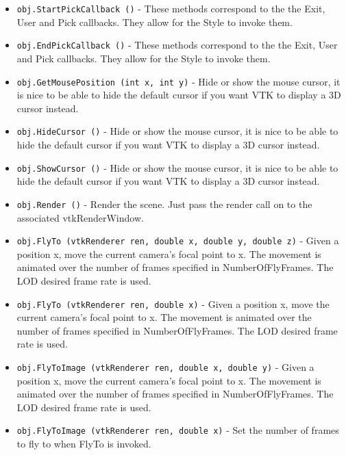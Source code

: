 \begin{itemize}
\item  \verb|obj.StartPickCallback ()| -  These methods correspond to the the Exit, User and Pick
 callbacks. They allow for the Style to invoke them.

\item  \verb|obj.EndPickCallback ()| -  These methods correspond to the the Exit, User and Pick
 callbacks. They allow for the Style to invoke them.

\item  \verb|obj.GetMousePosition (int x, int y)| -  Hide or show the mouse cursor, it is nice to be able to hide the
 default cursor if you want VTK to display a 3D cursor instead.

\item  \verb|obj.HideCursor ()| -  Hide or show the mouse cursor, it is nice to be able to hide the
 default cursor if you want VTK to display a 3D cursor instead.

\item  \verb|obj.ShowCursor ()| -  Hide or show the mouse cursor, it is nice to be able to hide the
 default cursor if you want VTK to display a 3D cursor instead.

\item  \verb|obj.Render ()| -  Render the scene. Just pass the render call on to the 
 associated vtkRenderWindow.

\item  \verb|obj.FlyTo (vtkRenderer ren, double x, double y, double z)| -  Given a position x, move the current camera's focal point to x.
 The movement is animated over the number of frames specified in
 NumberOfFlyFrames. The LOD desired frame rate is used.

\item  \verb|obj.FlyTo (vtkRenderer ren, double x)| -  Given a position x, move the current camera's focal point to x.
 The movement is animated over the number of frames specified in
 NumberOfFlyFrames. The LOD desired frame rate is used.

\item  \verb|obj.FlyToImage (vtkRenderer ren, double x, double y)| -  Given a position x, move the current camera's focal point to x.
 The movement is animated over the number of frames specified in
 NumberOfFlyFrames. The LOD desired frame rate is used.

\item  \verb|obj.FlyToImage (vtkRenderer ren, double x)| -  Set the number of frames to fly to when FlyTo is invoked.


\end{itemize}

